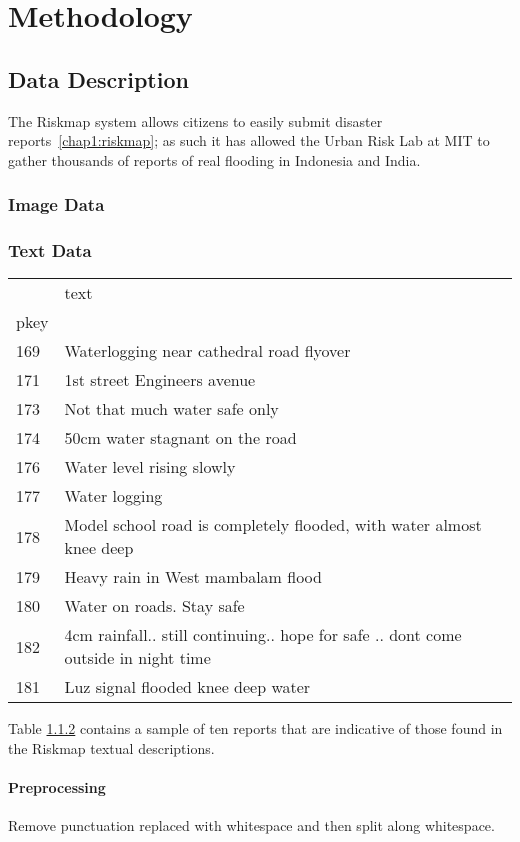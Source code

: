 \chapter{Methodology}
\section{Data Description}
The Riskmap system allows citizens to easily submit
disaster reports~\ref{chap1:riskmap}; as such it has allowed the Urban Risk Lab at
MIT to gather thousands of reports of real flooding in Indonesia and India.

\subsection{Image Data}

\subsection{Text Data}
\label{table:text_sample}
\begin{tabular}{l|l}
	\toprule
	{} &
	text \\
	pkey &
	\\
	\hline
	\midrule
	169  &
	Waterlogging near cathedral road flyover  \\
	171  &
	1st street Engineers avenue \\
	173  &
	Not that much water safe only \\
	174  &
	50cm water stagnant on the road \\
	176  &
	Water level rising  slowly  \\
	177  &
	Water logging  \\
	178  &
	Model school road is completely flooded, with water almost knee deep \\
	179  &
	Heavy rain in West mambalam flood \\
	180  &
	Water on roads. Stay safe \\
	182  &                                                           4cm
	rainfall.. still continuing.. hope for safe .. dont come outside in
	night time \\
	181  &
	Luz signal flooded knee deep water \\
	\bottomrule
\end{tabular}

Table \ref{table:text_sample} contains a sample of ten reports that are 
indicative of those found in the Riskmap textual descriptions.

\subsubsection{Preprocessing}
Remove punctuation replaced with whitespace and then split along whitespace.
